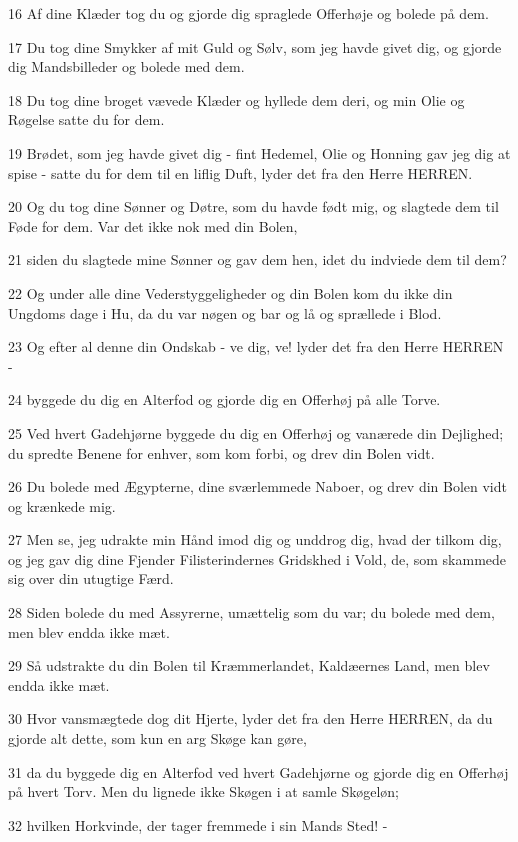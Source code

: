 \par 16 Af dine Klæder tog du og gjorde dig spraglede Offerhøje og bolede på dem.
\par 17 Du tog dine Smykker af mit Guld og Sølv, som jeg havde givet dig, og gjorde dig Mandsbilleder og bolede med dem.
\par 18 Du tog dine broget vævede Klæder og hyllede dem deri, og min Olie og Røgelse satte du for dem.
\par 19 Brødet, som jeg havde givet dig - fint Hedemel, Olie og Honning gav jeg dig at spise - satte du for dem til en liflig Duft, lyder det fra den Herre HERREN.
\par 20 Og du tog dine Sønner og Døtre, som du havde født mig, og slagtede dem til Føde for dem. Var det ikke nok med din Bolen,
\par 21 siden du slagtede mine Sønner og gav dem hen, idet du indviede dem til dem?
\par 22 Og under alle dine Vederstyggeligheder og din Bolen kom du ikke din Ungdoms dage i Hu, da du var nøgen og bar og lå og sprællede i Blod.
\par 23 Og efter al denne din Ondskab - ve dig, ve! lyder det fra den Herre HERREN -
\par 24 byggede du dig en Alterfod og gjorde dig en Offerhøj på alle Torve.
\par 25 Ved hvert Gadehjørne byggede du dig en Offerhøj og vanærede din Dejlighed; du spredte Benene for enhver, som kom forbi, og drev din Bolen vidt.
\par 26 Du bolede med Ægypterne, dine sværlemmede Naboer, og drev din Bolen vidt og krænkede mig.
\par 27 Men se, jeg udrakte min Hånd imod dig og unddrog dig, hvad der tilkom dig, og jeg gav dig dine Fjender Filisterindernes Gridskhed i Vold, de, som skammede sig over din utugtige Færd.
\par 28 Siden bolede du med Assyrerne, umættelig som du var; du bolede med dem, men blev endda ikke mæt.
\par 29 Så udstrakte du din Bolen til Kræmmerlandet, Kaldæernes Land, men blev endda ikke mæt.
\par 30 Hvor vansmægtede dog dit Hjerte, lyder det fra den Herre HERREN, da du gjorde alt dette, som kun en arg Skøge kan gøre,
\par 31 da du byggede dig en Alterfod ved hvert Gadehjørne og gjorde dig en Offerhøj på hvert Torv. Men du lignede ikke Skøgen i at samle Skøgeløn;
\par 32 hvilken Horkvinde, der tager fremmede i sin Mands Sted! -
